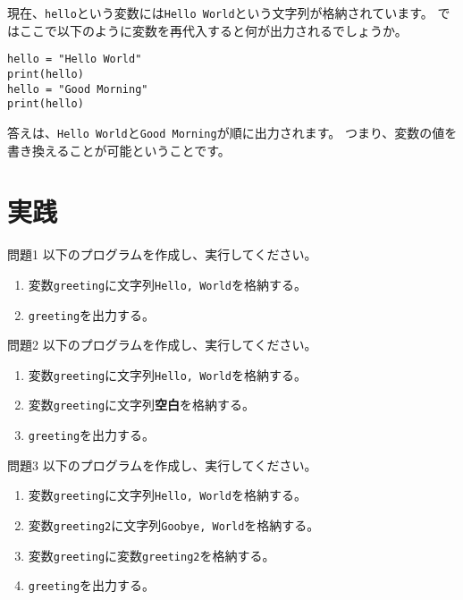 \documentclass[a4paper,titlepage,dvipdfmx]{jarticle}
\begin{document}
現在、\texttt{hello}という変数には\texttt{Hello World}という文字列が格納されています。
ではここで以下のように変数を再代入すると何が出力されるでしょうか。
\begin{lstlisting}[caption=変数の再代入,label=変数の再代入]
hello = "Hello World"
print(hello)
hello = "Good Morning"
print(hello)
\end{lstlisting}
答えは、\texttt{Hello World}と\texttt{Good Morning}が順に出力されます。
つまり、変数の値を書き換えることが可能ということです。

\section{実践}
\begin{itembox}[l]{問題1}
  以下のプログラムを作成し、実行してください。
  \begin{enumerate}
    \item 変数\texttt{greeting}に文字列\texttt{Hello, World}を格納する。
    \item \texttt{greeting}を出力する。
  \end{enumerate}
\end{itembox}
\begin{itembox}[l]{問題2}
  以下のプログラムを作成し、実行してください。
  \begin{enumerate}
    \item 変数\texttt{greeting}に文字列\texttt{Hello, World}を格納する。
    \item 変数\texttt{greeting}に文字列\textbf{空白}を格納する。
    \item \texttt{greeting}を出力する。
  \end{enumerate}
\end{itembox}
\begin{itembox}[l]{問題3}
  以下のプログラムを作成し、実行してください。
  \begin{enumerate}
    \item 変数\texttt{greeting}に文字列\texttt{Hello, World}を格納する。
    \item 変数\texttt{greeting2}に文字列\texttt{Goobye, World}を格納する。
    \item 変数\texttt{greeting}に変数\texttt{greeting2}を格納する。
    \item \texttt{greeting}を出力する。
  \end{enumerate}
\end{itembox}
\end{document}
